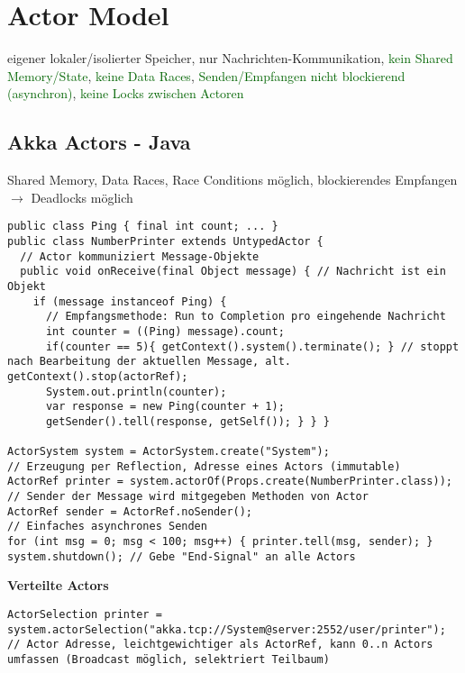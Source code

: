 \section{Actor Model}
eigener lokaler/isolierter Speicher, nur Nachrichten-Kommunikation, \textcolor{darkGreen}{kein Shared Memory/State}, \textcolor{darkGreen}{keine Data Races}, \textcolor{darkGreen}{Senden/Empfangen nicht blockierend (asynchron)}, \textcolor{darkGreen}{keine Locks zwischen Actoren}

\subsection{Akka Actors - Java}
Shared Memory, Data Races, Race Conditions möglich, blockierendes Empfangen $\rightarrow$ Deadlocks möglich

\begin{lstlisting}
public class Ping { final int count; ... }
public class NumberPrinter extends UntypedActor {
  // Actor kommuniziert Message-Objekte
  public void onReceive(final Object message) { // Nachricht ist ein Objekt
  	if (message instanceof Ping) {
      // Empfangsmethode: Run to Completion pro eingehende Nachricht
  	  int counter = ((Ping) message).count;
  	  if(counter == 5){ getContext().system().terminate(); } // stoppt nach Bearbeitung der aktuellen Message, alt. getContext().stop(actorRef);
      System.out.println(counter);
      var response = new Ping(counter + 1);
      getSender().tell(response, getSelf()); } } }

ActorSystem system = ActorSystem.create("System");
// Erzeugung per Reflection, Adresse eines Actors (immutable)
ActorRef printer = system.actorOf(Props.create(NumberPrinter.class));
// Sender der Message wird mitgegeben Methoden von Actor
ActorRef sender = ActorRef.noSender();
// Einfaches asynchrones Senden
for (int msg = 0; msg < 100; msg++) { printer.tell(msg, sender); }
system.shutdown(); // Gebe "End-Signal" an alle Actors
\end{lstlisting}

\textbf{Verteilte Actors}

\begin{lstlisting}
ActorSelection printer = system.actorSelection("akka.tcp://System@server:2552/user/printer"); // Actor Adresse, leichtgewichtiger als ActorRef, kann 0..n Actors umfassen (Broadcast möglich, selektriert Teilbaum)
\end{lstlisting}
